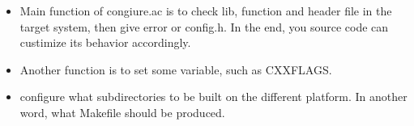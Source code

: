 \documentclass[paper=8.5in:11in, twoside, 12pt, pagesize=pdftex]{book}
\begin{document}
\begin{itemize}
\begin{verbatim}
AC_CONFIG_FILES([Makefile
                 src/Makefile
                 src/aaa/Makefile
                 src/bbb/Makefile
                 src/ccc/Makefile
                 ])
#which make file you want to produce.                 
                
AC_OUTPUT
\end{verbatim}
\item Main function of congiure.ac is to check lib, function and header file in the target system, then give error or config.h. In the end, you source code can custimize its behavior accordingly.

\item Another function is to set some variable, such as CXXFLAGS.

\item configure what subdirectories to be built on the different platform. In another word, what Makefile should be produced.

\end{itemize}
\end{document}
